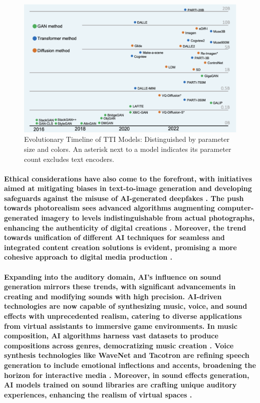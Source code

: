\documentclass[11pt,a4paper,oneside]{report}
\begin{document}
\begin{figure}[htbp]
  \centering
  \includegraphics[width=\textwidth]{models.png}
  \caption{Evolutionary Timeline of TTI Models: Distinguished by parameter size and colors. An asterisk next to a model indicates its parameter count excludes text encoders. \cite{bie2023renaissance}}
\end{figure}

\paragraph{Ethical considerations have also come to the forefront, with initiatives aimed at mitigating biases in text-to-image generation and developing safeguards against the misuse of AI-generated deepfakes \cite{esposito2023mitigating}. The push towards photorealism sees advanced algorithms augmenting computer-generated imagery to levels indistinguishable from actual photographs, enhancing the authenticity of digital creations \cite{richter2022enhancing}. Moreover, the trend towards unification of different AI techniques for seamless and integrated content creation solutions is evident, promising a more cohesive approach to digital media production \cite{esser2022towards}.}

\paragraph{Expanding into the auditory domain, AI's influence on sound generation mirrors these trends, with significant advancements in creating and modifying sounds with high precision. AI-driven technologies are now capable of synthesizing music, voice, and sound effects with unprecedented realism, catering to diverse applications from virtual assistants to immersive game environments. In music composition, AI algorithms harness vast datasets to produce compositions across genres, democratizing music creation \cite{briot2021artificial}. Voice synthesis technologies like WaveNet and Tacotron are refining speech generation to include emotional inflections and accents, broadening the horizon for interactive media \cite{oord2016wavenet}. Moreover, in sound effects generation, AI models trained on sound libraries are crafting unique auditory experiences, enhancing the realism of virtual spaces \cite{greshler2021catch}.}
\end{document}
